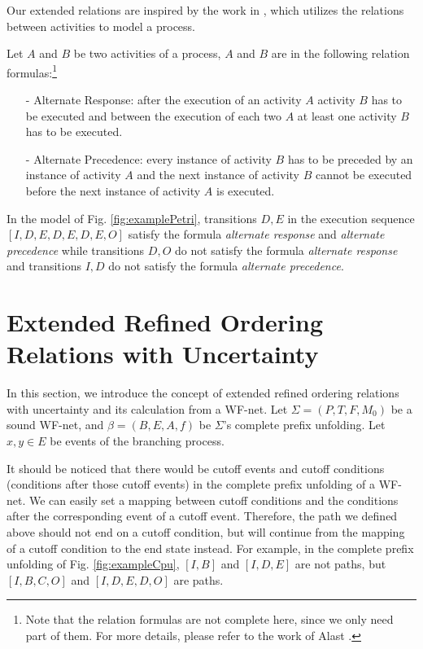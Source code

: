 \documentclass{llncs}
\begin{document}
Our extended relations are inspired by the work in \cite{van2006decserflow}, which utilizes the relations between activities to model a process.
\begin{definition}\label{def:relationFormulas}
Let $A$ and $B$ be two activities of a process, $A$ and $B$ are in the following relation formulas:\footnote{Note that the relation formulas are not complete here, since we only need part of them. For more details, please refer to the work of Alast \cite{van2006decserflow}.}
	\begin{itemize}
		\item[-] Alternate Response: after the execution of an activity $A$ activity $B$ has to be executed and between the execution of each two $A$ at least one activity $B$ has to be executed.
		\item[-] Alternate Precedence: every instance of activity $B$ has to be preceded by an instance of activity $A$ and the next instance of activity $B$ cannot be executed before the next instance of activity $A$ is executed.
	\end{itemize}
\end{definition}

\begin{example}\label{ex:relationFormulas}
In the model of Fig. \ref{fig:examplePetri}, transitions $D,E$ in the execution sequence $[I,D,E,D,E,D,E,O]$ satisfy the formula \textit{alternate response} and \textit{alternate precedence} while transitions $D,O$ do not satisfy the formula \textit{alternate response} and transitions $I,D$ do not satisfy the formula \textit{alternate precedence}.
\end{example}

\section{Extended Refined Ordering Relations with Uncertainty}\label{sec:relations}
In this section, we introduce the concept of extended refined ordering relations with uncertainty and its calculation from a WF-net. Let $\Sigma=(P,T,F,M_{0})$ be a sound WF-net, and $\beta=(B,E,A,f)$ be $\Sigma$'s complete prefix unfolding. Let $x,y\in E$ be events of the branching process.

It should be noticed that there would be cutoff events and cutoff conditions (conditions after those cutoff events) in the complete prefix unfolding of a WF-net. We can easily set a mapping between cutoff conditions and the conditions after the corresponding event of a cutoff event. Therefore, the path we defined above should not end on a cutoff condition, but will continue from the mapping of a cutoff condition to the end state instead. For example, in the complete prefix unfolding of Fig. \ref{fig:exampleCpu}, $[I,B]$ and $[I,D,E]$ are not paths, but $[I,B,C,O]$ and $[I,D,E,D,O]$ are paths.
\end{document}
